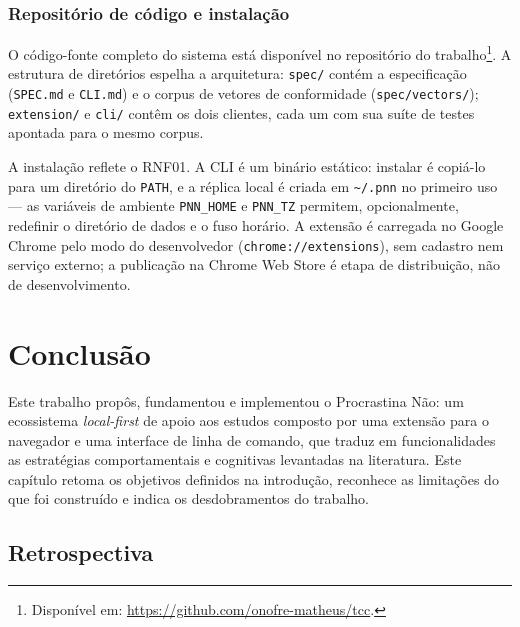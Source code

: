 \documentclass[12pt, %
openright, 
oneside,
a4paper,
english,   %
brazil]{facom-ufu-abntex2}
\begin{document}
\subsection{Repositório de código e instalação}
\label{sub:repositorio}

O código-fonte completo do sistema está disponível no repositório do
trabalho\footnote{Disponível em: \url{https://github.com/onofre-matheus/tcc}.}.
A estrutura de diretórios
espelha a arquitetura: \texttt{spec/} contém a especificação
(\texttt{SPEC.md} e \texttt{CLI.md}) e o corpus de vetores de conformidade
(\texttt{spec/vectors/}); \texttt{extension/} e \texttt{cli/} contêm os dois
clientes, cada um com sua suíte de testes apontada para o mesmo corpus.

A instalação reflete o RNF01. A CLI é um binário estático: instalar é
copiá-lo para um diretório do \texttt{PATH}, e a réplica local é criada em
\texttt{\textasciitilde/.pnn} no primeiro uso --- as variáveis de ambiente
\texttt{PNN\_HOME} e \texttt{PNN\_TZ} permitem, opcionalmente, redefinir o
diretório de dados e o fuso horário. A extensão é carregada no Google Chrome
pelo modo do desenvolvedor (\texttt{chrome://extensions}), sem cadastro nem
serviço externo; a publicação na Chrome Web Store é etapa de distribuição,
não de desenvolvimento.

\chapter{Conclusão}
\label{cap:conclusao}

Este trabalho propôs, fundamentou e implementou o Procrastina Não: um
ecossistema \textit{local-first} de apoio aos estudos composto por uma
extensão para o navegador e uma interface de linha de comando, que traduz em
funcionalidades as estratégias comportamentais e cognitivas levantadas na
literatura. Este capítulo retoma os objetivos definidos na introdução,
reconhece as limitações do que foi construído e indica os desdobramentos do
trabalho.

\section{Retrospectiva}
\end{document}
